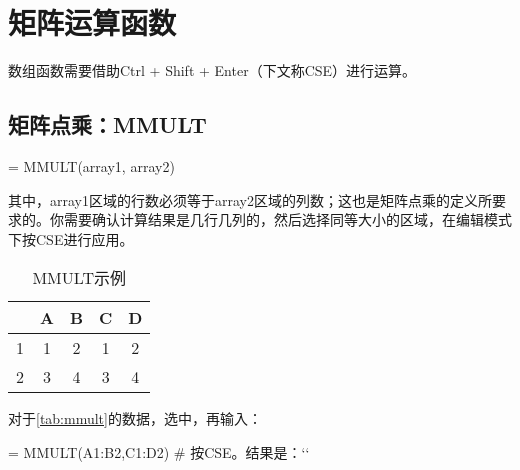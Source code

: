 \section{矩阵运算函数}
数组函数需要借助Ctrl + Shift + Enter（下文称CSE）进行运算。

\subsection{矩阵点乘：MMULT}
\begin{syntax}
= MMULT(array1, array2)
\end{syntax}

其中，array1区域的行数必须等于array2区域的列数；这也是矩阵点乘的定义所要求的。你需要确认计算结果是几行几列的，然后选择同等大小的区域，在编辑模式下按CSE进行应用。

\begin{table}[!hbt]
    \centering
    \caption{MMULT示例}\label{tab:mmult}
    \begin{tabular}{c|cccc}
    \hline
      & A & B & C & D \\
    \hline
    1 & 1 & 2 & 1 & 2 \\
    2 & 3 & 4 & 3 & 4 \\
    \hline
    \end{tabular}
\end{table}

对于\autoref{tab:mmult}的数据，选中，再输入：
\begin{excode}
= MMULT(A1:B2,C1:D2)  # 按CSE。结果是：``
\end{excode}

